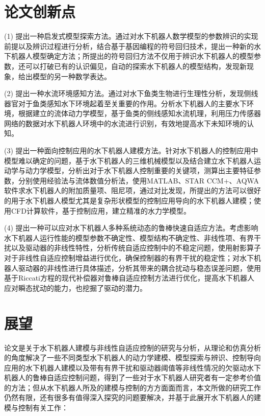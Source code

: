 \section{论文创新点}

(1) 提出一种启发式模型探索方法。通过对水下机器人数学模型的参数辨识的实现前提以及辨识过程进行分析，结合基于基因编程的符号回归技术，提出一种新的水下机器人模型确定方法；所提出的符号回归方法不仅用于辨识水下机器人的模型参数，还可以打破已有的认识偏见，自动的探索水下机器人的模型结构，发现新现象，给出模型的另一种数学表达。

(2) 提出一种水流环境感知方法。通过对水下鱼类生物进行生理性分析，发现侧线器官对于鱼类感知水下环境起着至关重要的作用。分析水下机器人的主要水下环境，根据建立的流体动力学模型，基于鱼类的侧线感知水流机理，利用压力传感器网络的数据对水下机器人环境中的水流进行识别，有效地提高水下未知环境的认知。

(3) 提出一种面向控制应用的水下机器人建模方法。针对水下机器人的控制应用中模型难以确定的问题，基于水下机器人的三维机械模型以及结合建立水下机器人运动学与动力学模型，分析出对于水下机器人控制重要的关键项，测算出主要特征参数，分别使用经验法与流体数值分析法，使用MATLAB、STAR CCM+、AQWA软件求水下机器人的附加质量项、阻尼项，通过对比发现，所提出的方法可以很好的用于水下机器人模型尤其是复杂形状模型的控制应用导向的水下机器人建模；使用CFD计算软件，基于控制应用，建立精准的水力学模型。

(4) 提出一种可以应对水下机器人多种系统动态的鲁棒快速自适应方法。考虑影响水下机器人运行性能的模型参数不确定性、模型结构不确定性、非线性项、有界干扰以及驱动器的非线性特性，分析传统自适应控制中的不稳定问题，使用射影算子对于非线性自适应控制增益进行优化，确保控制器的有界干扰的稳定性；对水下机器人驱动器的非线性进行具体描述，分析其带来的耦合扰动与稳态误差问题，使用基于Riccati方程的现代补偿器对鲁棒自适应控制方法进行优化，提高水下机器人应对瞬态扰动的能力，也挖掘了驱动的潜力。



\section{展望}
论文是关于水下机器人建模与非线性自适应控制的研究与分析，从理论和仿真分析的角度解决了一些不同类型水下机器人的动力学建模、模型探索与辨识、控制导向应用的水下机器人建模以及带有有界干扰和驱动器阈值等非线性情况的欠驱动水下机器人的鲁棒自适应控制问题，得到了一些对于水下机器人研究者有一定参考价值的方法；但从水下机器人所及的建模与控制的方方面面而言，本文所做的研究工作仍然有限，还有很多有值得深入探究的问题要解决，并基于此展开水下机器人的建模与控制有关工作：

